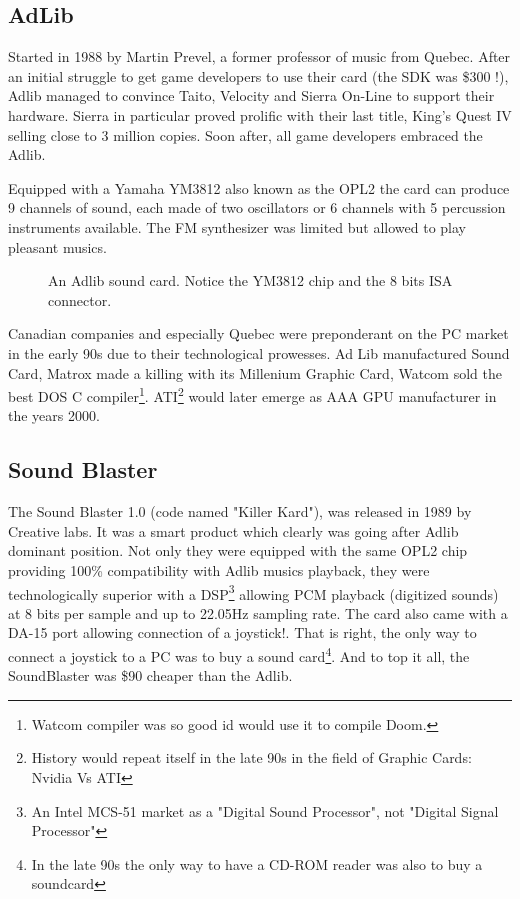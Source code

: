 \documentclass[book.tex]{subfiles}
\begin{document}
  \subsection{AdLib}
  Started in 1988 by Martin Prevel, a former professor of music from Quebec. After an initial struggle to get game developers to use their card (the SDK was \$300 !), Adlib managed to convince Taito, Velocity and Sierra On-Line to support their hardware. Sierra in particular proved prolific with their last title, King's Quest IV selling close to 3 million copies. Soon after, all game developers embraced the Adlib.\\
  \par
   Equipped with a Yamaha YM3812 also known as the OPL2 the card can produce 9 channels of sound, each made of two oscillators or 6 channels with 5 percussion instruments available. The FM synthesizer was limited but allowed to play pleasant musics.\\
  \begin{figure}[H] 
    \centering 
    \caption{An Adlib sound card. Notice the YM3812 chip and the 8 bits ISA connector.}
  \end{figure}
   
\par
{} Canadian companies and especially Quebec were preponderant on the PC market in the early 90s due to their technological prowesses. Ad Lib manufactured Sound Card, Matrox made a killing with its Millenium Graphic Card, Watcom sold the best DOS C compiler\footnote{Watcom compiler was so good id would use it to compile Doom.}. ATI\footnote{History would repeat itself in the late 90s in the field of Graphic Cards: Nvidia Vs ATI} would later emerge as AAA GPU manufacturer in the years 2000.\\
  
  


  \subsection{Sound Blaster}
  The Sound Blaster 1.0 (code named "Killer Kard"), was released in 1989 by Creative labs. It was a smart product which clearly was going after Adlib dominant position. Not only they were equipped with the same OPL2 chip providing 100\% compatibility with Adlib musics playback, they were technologically superior with a DSP\footnote{An Intel MCS-51 market as a "Digital Sound Processor", not "Digital Signal Processor"}  allowing PCM playback (digitized sounds) at 8 bits per sample and up to 22.05Hz sampling rate. The card also came with a DA-15 port allowing connection of a joystick!. That is right, the only way to connect a joystick to a PC was to buy a sound card\footnote{In the late 90s the only way to have a CD-ROM reader was also to buy a soundcard}. And to top it all, the SoundBlaster was \$90 cheaper than the Adlib.\\ 
\par
\end{document}
